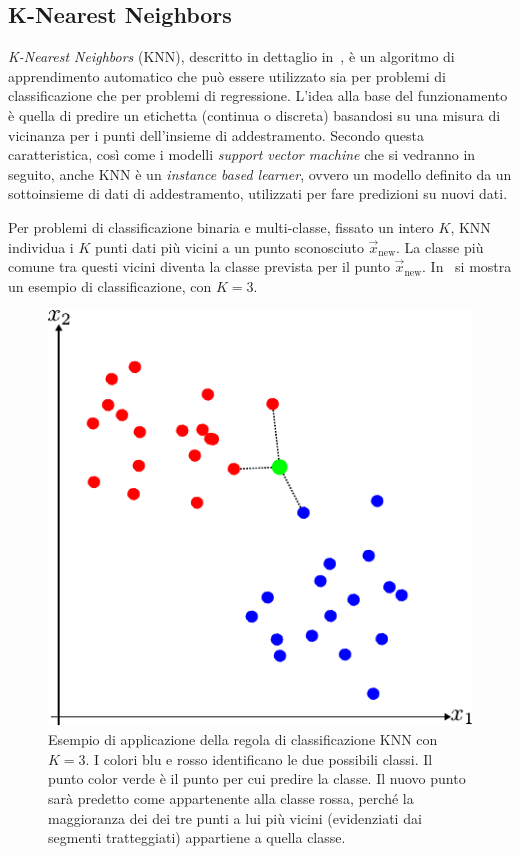 \subsection{K-Nearest Neighbors}\label{sec:ml:knn}
\emph{K-Nearest Neighbors} (KNN), descritto in dettaglio in~\cite{KNN}, è un algoritmo di apprendimento automatico che può essere utilizzato sia per problemi di classificazione che  per problemi di regressione. 
L'idea alla base del funzionamento è quella di predire un etichetta (continua o discreta) basandosi su una misura di vicinanza per i punti dell'insieme di addestramento. 
Secondo questa caratteristica, così come i modelli \emph{support vector machine} che si vedranno in seguito, anche KNN è un \emph{instance based learner}, ovvero un modello definito da un sottoinsieme di dati di addestramento, utilizzati per fare predizioni su nuovi dati.

Per problemi di classificazione binaria e multi-classe, fissato un intero $K$, KNN individua i $K$ punti dati più vicini a un punto sconosciuto $\Vec{x}_\text{new}$. 
La classe più comune tra questi vicini diventa la classe prevista per il punto $\Vec{x}_\text{new}$. 
In~ si mostra un esempio di classificazione, con $K=3$.
\begin{figure}
    \centering
    \includegraphics[width=0.7\linewidth]{img/KNN.pdf}
    \caption[Esempio \emph{K-Nearest Neighbors}.]{Esempio di applicazione della regola di classificazione KNN con $K=3$. I colori blu e rosso identificano le due possibili classi. Il punto color verde è il punto per cui predire la classe.
    Il nuovo punto sarà predetto come appartenente alla classe rossa, perché la maggioranza dei dei tre punti a lui più vicini (evidenziati dai segmenti tratteggiati) appartiene a quella classe.}
    \label{fig:knn_example}
\end{figure}

